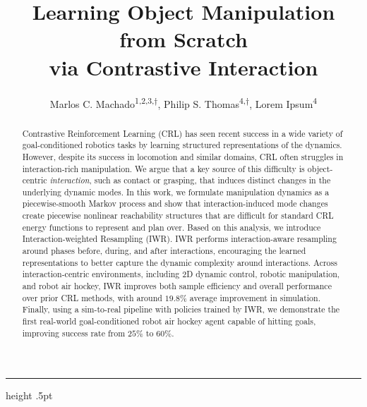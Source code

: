 \documentclass[10pt]{article} %
\title{Learning Object Manipulation from Scratch \\ via Contrastive Interaction}
\author{Marlos C. Machado\textsuperscript{1,2,3,$\dagger$}, Philip S. Thomas\textsuperscript{4,$\dagger$}, Lorem Ipsum\textsuperscript{4}}
\newcommand{\methodname}{Interaction-weighted Resampling}
\newcommand{\methodshort}{IWR}
\begin{document}
\makeCover  %
\maketitle  %

\begin{abstract}
Contrastive Reinforcement Learning (CRL) has seen recent success in a wide variety of goal-conditioned robotics tasks by learning structured representations of the dynamics. However, despite its success in locomotion and similar domains, CRL often struggles in interaction-rich manipulation. We argue that a key source of this difficulty is object-centric \textit{interaction}, such as contact or grasping, that induces distinct changes in the underlying dynamic modes. In this work, we formulate manipulation dynamics as a piecewise-smooth Markov process and show that interaction-induced mode changes create piecewise nonlinear reachability structures that are difficult for standard CRL energy functions to represent and plan over. Based on this analysis, we introduce \methodname{} (\methodshort{}). \methodshort{} performs interaction-aware resampling around phases before, during, and after interactions, encouraging the learned representations to better capture the dynamic complexity around interactions. Across interaction-centric environments, including 2D dynamic control, robotic manipulation, and robot air hockey, \methodshort{} improves both sample efficiency and overall performance over prior CRL methods, with around $19.8\%$ average improvement in simulation. Finally, using a sim-to-real pipeline with policies trained by \methodshort{}, we demonstrate the first real-world goal-conditioned robot air hockey agent capable of hitting goals, improving success rate from $25\%$ to $60\%$.
\end{abstract}








\clearpage


\appendix 
\newpage
\beginSupplementaryMaterials
{}
\vspace{4mm}
\hrule height .5pt
\vspace{8mm}
\end{document}
